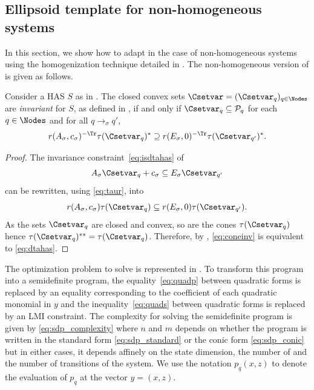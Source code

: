 \documentclass[11pt,twoside,a4paper,openright]{uclouvain-thesis}
\newcommand{\tr}{\to}
\newcommand{\trs}[1][\sigma]{\tr_{#1}}
\newcommand{\Ps}{\mathcal{P}}
\newcommand{\sys}{S}
\newcommand{\dtahas}{HAS}
\begin{document}
\subsection{Ellipsoid template for non-homogeneous systems}
\label{sec:ellipsoids}
In this section, we show how to adapt  in the case of non-homogeneous systems using the homogenization technique detailed in .
The non-homogeneous version of  is given as follows.

\begin{mytheo}
  \label{theo:dtahas}
  Consider a \dtahas{} $\sys$ as in . %
  The closed convex sets $\Csetvar = (\Csetvar_q)_{q \in \Nodes}$ are \emph{invariant} for $\sys$,
  as defined in , if and only if
  $\Csetvar_q \subseteq \Ps_q$ for each $q \in \Nodes$ and
  for all $q \trs q'$,
  \begin{equation}
    \label{eq:dtahas}
    r(A_\sigma, c_\sigma)^{-\Tr} \tau(\Csetvar_q)^* \supseteq r(E_\sigma, 0)^{-\Tr} \tau(\Csetvar_{q'})^*.
  \end{equation}
  \begin{proof}
    The invariance constraint~\eqref{eq:isdtahas} of 
    \[ A_\sigma \Csetvar_q + c_\sigma \subseteq E_\sigma \Csetvar_{q'} \]
    can be rewritten, using \eqref{eq:taur}, into
    \begin{equation}
      \label{eq:coneinv}
      r(A_\sigma, c_\sigma) \tau(\Csetvar_q) \subseteq r(E_\sigma, 0) \tau(\Csetvar_{q'}).
    \end{equation}
    As the sets $\Csetvar_q$ are closed and convex, so are the cones $\tau(\Csetvar_q)$
    hence $\tau(\Csetvar_q)^{**} = \tau(\Csetvar_q)$.
    Therefore, by , \eqref{eq:coneinv} is equivalent to \eqref{eq:dtahas}.
  \end{proof}
\end{mytheo}


The optimization problem to solve is represented in .
To transform this program into a semidefinite program,
the equality~\eqref{eq:quadp} between quadratic forms is replaced by an equality corresponding
to the coefficient of each quadratic monomial in $y$ and
the inequality~\eqref{eq:quads} between quadratic forms is replaced by an LMI constraint.
The complexity for solving the semidefinite program is given by \eqref{eq:sdp_complexity}
where $n$ and $m$ depends on whether the program is written in the standard form \eqref{eq:sdp_standard} or the conic form \eqref{eq:sdp_conic} but in either cases, it depends affinely on the state dimension, the number of \nodes{} and the number of transitions of the system.
We use the notation $p_q(x, z)$ to denote the evaluation of $p_q$ at the vector $y = (x, z)$.
\end{document}
